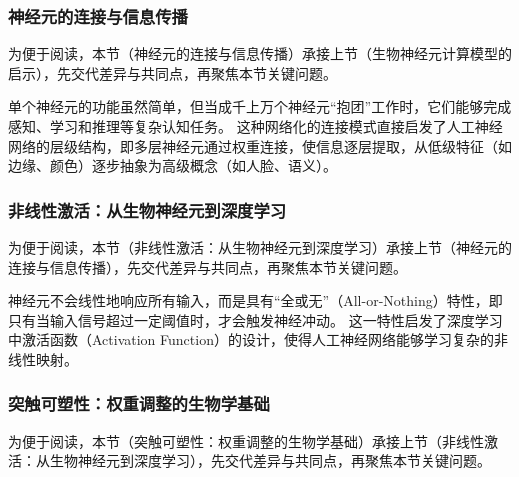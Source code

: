 \subsubsection*{神经元的连接与信息传播}


为便于阅读，本节（神经元的连接与信息传播）承接上节（生物神经元计算模型的启示），先交代差异与共同点，再聚焦本节关键问题。

单个神经元的功能虽然简单，但当成千上万个神经元“抱团”工作时，它们能够完成感知、学习和推理等复杂认知任务。
这种网络化的连接模式直接启发了人工神经网络的层级结构，即多层神经元通过权重连接，使信息逐层提取，从低级特征（如边缘、颜色）逐步抽象为高级概念（如人脸、语义）。
\subsubsection*{非线性激活：从生物神经元到深度学习}


为便于阅读，本节（非线性激活：从生物神经元到深度学习）承接上节（神经元的连接与信息传播），先交代差异与共同点，再聚焦本节关键问题。

神经元不会线性地响应所有输入，而是具有“全或无”（All-or-Nothing）特性，即只有当输入信号超过一定阈值时，才会触发神经冲动。
这一特性启发了深度学习中激活函数（Activation Function）的设计，使得人工神经网络能够学习复杂的非线性映射。
\subsubsection*{突触可塑性：权重调整的生物学基础}


为便于阅读，本节（突触可塑性：权重调整的生物学基础）承接上节（非线性激活：从生物神经元到深度学习），先交代差异与共同点，再聚焦本节关键问题。

